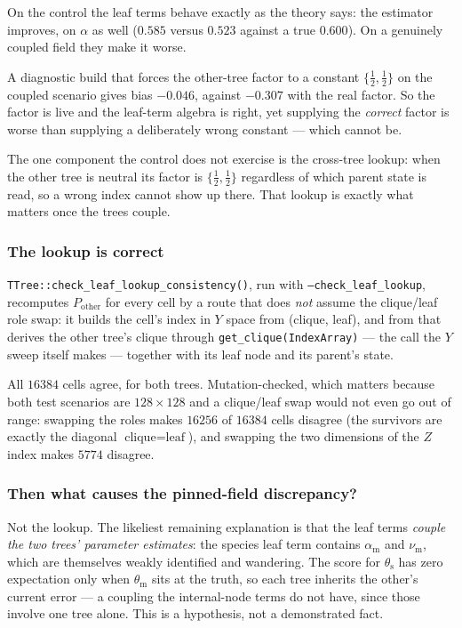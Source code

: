 \documentclass[11pt,a4paper]{article}
\newcommand{\Ys}{Y}
\begin{document}
On the control the leaf terms behave exactly as the theory says: the estimator improves, on
$\alpha$ as well ($0.585$ versus $0.523$ against a true $0.600$). On a genuinely coupled field
they make it worse.

A diagnostic build that forces the other-tree factor to a constant $\{\tfrac12,\tfrac12\}$ on
the coupled scenario gives bias $-0.046$, against $-0.307$ with the real factor. So the factor
is live and the leaf-term algebra is right, yet supplying the \emph{correct} factor is worse
than supplying a deliberately wrong constant --- which cannot be.

The one component the control does not exercise is the cross-tree lookup: when the other tree
is neutral its factor is $\{\tfrac12,\tfrac12\}$ regardless of which parent state is read, so a
wrong index cannot show up there. That lookup is exactly what matters once the trees couple.

\subsubsection*{The lookup is correct}

\texttt{TTree::check\_leaf\_lookup\_consistency()}, run with \texttt{--check\_leaf\_lookup},
recomputes $P_{\mathrm{other}}$ for every cell by a route that does \emph{not} assume the
clique/leaf role swap: it builds the cell's index in $\Ys$ space from (clique, leaf), and from
that derives the other tree's clique through \texttt{get\_clique(IndexArray)} --- the call the
$\Ys$ sweep itself makes --- together with its leaf node and its parent's state.

All $16384$ cells agree, for both trees. Mutation-checked, which matters because both test
scenarios are $128\times128$ and a clique/leaf swap would not even go out of range: swapping
the roles makes $16256$ of $16384$ cells disagree (the survivors are exactly the diagonal
$\text{clique}=\text{leaf}$), and swapping the two dimensions of the $Z$ index makes $5774$
disagree.

\subsubsection*{Then what causes the pinned-field discrepancy?}

Not the lookup. The likeliest remaining explanation is that the leaf terms \emph{couple the two
trees' parameter estimates}: the species leaf term contains $\alpha_{\mathrm{m}}$ and
$\nu_{\mathrm{m}}$, which are themselves weakly identified and wandering. The score for
$\theta_{\mathrm{s}}$ has zero expectation only when $\theta_{\mathrm{m}}$ sits at the truth,
so each tree inherits the other's current error --- a coupling the internal-node terms do not
have, since those involve one tree alone. This is a hypothesis, not a demonstrated fact.
\end{document}
